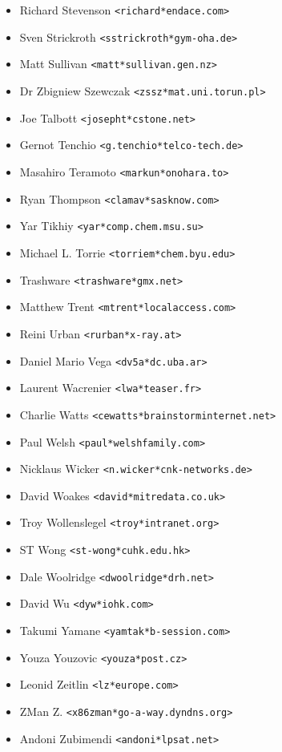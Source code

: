 \documentclass[a4paper,titlepage,12pt]{article}
\newcommand{\email}[1]{\texttt{#1}}
\begin{document}
\begin{itemize}
	\item Richard Stevenson \email{<richard*endace.com>}
	\item Sven Strickroth \email{<sstrickroth*gym-oha.de>}
	\item Matt Sullivan \email{<matt*sullivan.gen.nz>}
	\item Dr Zbigniew Szewczak \email{<zssz*mat.uni.torun.pl>}
	\item Joe Talbott \email{<josepht*cstone.net>}
	\item Gernot Tenchio \email{<g.tenchio*telco-tech.de>}
	\item Masahiro Teramoto \email{<markun*onohara.to>}
	\item Ryan Thompson \email{<clamav*sasknow.com>}
	\item Yar Tikhiy \email{<yar*comp.chem.msu.su>}
	\item Michael L. Torrie \email{<torriem*chem.byu.edu>}
	\item Trashware \email{<trashware*gmx.net>}
	\item Matthew Trent \email{<mtrent*localaccess.com>}
	\item Reini Urban \email{<rurban*x-ray.at>}
	\item Daniel Mario Vega \email{<dv5a*dc.uba.ar>}
	\item Laurent Wacrenier \email{<lwa*teaser.fr>}
	\item Charlie Watts \email{<cewatts*brainstorminternet.net>}
	\item Paul Welsh \email{<paul*welshfamily.com>}
	\item Nicklaus Wicker \email{<n.wicker*cnk-networks.de>}
	\item David Woakes \email{<david*mitredata.co.uk>}
	\item Troy Wollenslegel \email{<troy*intranet.org>}
	\item ST Wong \email{<st-wong*cuhk.edu.hk>}
	\item Dale Woolridge \email{<dwoolridge*drh.net>}
	\item David Wu \email{<dyw*iohk.com>}
	\item Takumi Yamane \email{<yamtak*b-session.com>}
	\item Youza Youzovic \email{<youza*post.cz>}
	\item Leonid Zeitlin \email{<lz*europe.com>}
	\item ZMan Z. \email{<x86zman*go-a-way.dyndns.org>}
	\item Andoni Zubimendi \email{<andoni*lpsat.net>}
    \end{itemize}
\end{document}
